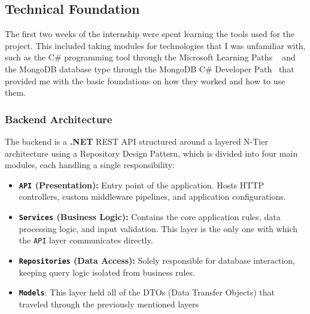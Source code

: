 \documentclass[11pt,a4paper]{article}
\begin{document}
\newpage

\subsection{Technical Foundation}
\label{sub:tech}

The first two weeks of the internship were spent learning the tools used for the project.
This included taking modules for technologies that I was unfamiliar with, such as the C\# programming tool through the Microsoft Learning Paths ~\cite{microsoftLearn} and the MongoDB database type through the MongoDB C\# Developer Path~\cite{mongoDBcSharp} that provided me with the basic foundations on how they worked and how to use them.


\subsubsection{Backend Architecture}
\label{subsub:tech:backend}

The backend is a \textbf{.NET} REST API structured around a layered N-Tier architecture using a Repository Design Pattern, which is divided into four main modules, each handling a single responsibility:

\begin{itemize}
    \item \textbf{\texttt{API} (Presentation):} Entry point of the application. Hosts HTTP controllers, custom middleware pipelines, and application configurations.

    \item \textbf{\texttt{Services} (Business Logic):} Contains the core application rules, data processing logic, and input validation. This layer is the only one with which the \texttt{API} layer communicates directly.

    \item \textbf{\texttt{Repositories} (Data Access):} Solely responsible for database interaction, keeping query logic isolated from business rules.

    \item \textbf{\texttt{Models}}: This layer held all of the DTOs (Data Transfer Objects) that traveled through the previously mentioned layers
\end{itemize}
\end{document}
